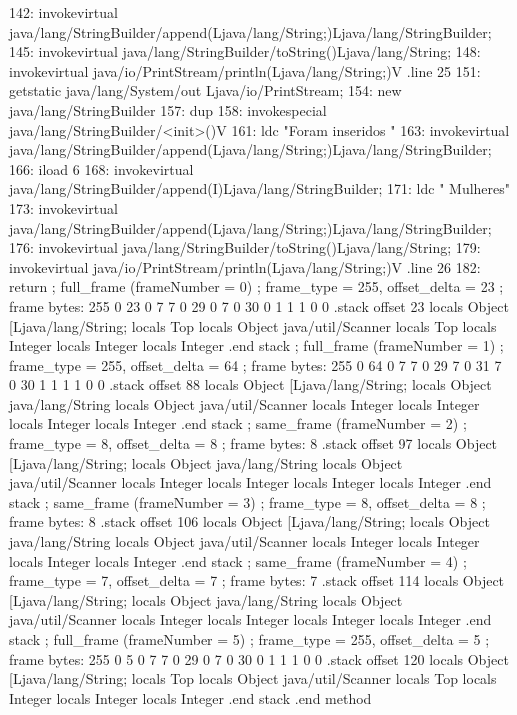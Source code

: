 \documentclass[12pt,a4paper,twoside]{report}
\begin{document}
\begin{terminal}
  142: invokevirtual java/lang/StringBuilder/append(Ljava/lang/String;)Ljava/lang/StringBuilder;
  145: invokevirtual java/lang/StringBuilder/toString()Ljava/lang/String;
  148: invokevirtual java/io/PrintStream/println(Ljava/lang/String;)V
  .line 25
  151: getstatic java/lang/System/out Ljava/io/PrintStream;
  154: new java/lang/StringBuilder
  157: dup
  158: invokespecial java/lang/StringBuilder/<init>()V
  161: ldc "Foram inseridos "
  163: invokevirtual java/lang/StringBuilder/append(Ljava/lang/String;)Ljava/lang/StringBuilder;
  166: iload 6
  168: invokevirtual java/lang/StringBuilder/append(I)Ljava/lang/StringBuilder;
  171: ldc " Mulheres"
  173: invokevirtual java/lang/StringBuilder/append(Ljava/lang/String;)Ljava/lang/StringBuilder;
  176: invokevirtual java/lang/StringBuilder/toString()Ljava/lang/String;
  179: invokevirtual java/io/PrintStream/println(Ljava/lang/String;)V
  .line 26
  182: return
  ; full_frame (frameNumber = 0)
  ; frame_type = 255, offset_delta = 23
  ; frame bytes: 255 0 23 0 7 7 0 29 0 7 0 30 0 1 1 1 0 0
  .stack
    offset 23
    locals Object [Ljava/lang/String;
    locals Top
    locals Object java/util/Scanner
    locals Top
    locals Integer
    locals Integer
    locals Integer
    .end stack
  ; full_frame (frameNumber = 1)
  ; frame_type = 255, offset_delta = 64
  ; frame bytes: 255 0 64 0 7 7 0 29 7 0 31 7 0 30 1 1 1 1 0 0
  .stack
    offset 88
    locals Object [Ljava/lang/String;
    locals Object java/lang/String
    locals Object java/util/Scanner
    locals Integer
    locals Integer
    locals Integer
    locals Integer
    .end stack
  ; same_frame (frameNumber = 2)
  ; frame_type = 8, offset_delta = 8
  ; frame bytes: 8
  .stack
    offset 97
    locals Object [Ljava/lang/String;
    locals Object java/lang/String
    locals Object java/util/Scanner
    locals Integer
    locals Integer
    locals Integer
    locals Integer
    .end stack
  ; same_frame (frameNumber = 3)
  ; frame_type = 8, offset_delta = 8
  ; frame bytes: 8
  .stack
    offset 106
    locals Object [Ljava/lang/String;
    locals Object java/lang/String
    locals Object java/util/Scanner
    locals Integer
    locals Integer
    locals Integer
    locals Integer
    .end stack
  ; same_frame (frameNumber = 4)
  ; frame_type = 7, offset_delta = 7
  ; frame bytes: 7
  .stack
    offset 114
    locals Object [Ljava/lang/String;
    locals Object java/lang/String
    locals Object java/util/Scanner
    locals Integer
    locals Integer
    locals Integer
    locals Integer
    .end stack
  ; full_frame (frameNumber = 5)
  ; frame_type = 255, offset_delta = 5
  ; frame bytes: 255 0 5 0 7 7 0 29 0 7 0 30 0 1 1 1 0 0
  .stack
    offset 120
    locals Object [Ljava/lang/String;
    locals Top
    locals Object java/util/Scanner
    locals Top
    locals Integer
    locals Integer
    locals Integer
    .end stack
.end method


\end{terminal}
\end{document}
